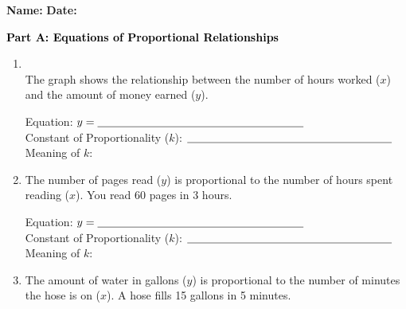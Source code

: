 \documentclass[12pt, letterpaper, fleqn]{article}
\newcommand{\blanklong}{\underline{\hspace{6.5cm}}}
\begin{document}
\textbf{Name:} \underline{\hspace{5cm}}
\hfill
\textbf{Date:} \underline{\hspace{3cm}}\\

\begin{tcolorbox}[colback=customteal!20]
\large\textcolor{black}{\textbf{Part A: Equations of Proportional Relationships}}
\end{tcolorbox}

\vspace{3mm}

\begin{enumerate}[itemsep=2.5cm, leftmargin=0.6cm]
\item {} \\
The graph shows the relationship between the number of hours worked ($x$) and the amount of money earned ($y$).

\vspace{1.5cm} %

\begin{tcolorbox}[colback=customteal!10, sharp corners]
Equation: $y = \blanklong$ \\
Constant of Proportionality ($k$): $\blanklong$ \\
Meaning of $k$: \blanklong
\end{tcolorbox}

\vspace{1.5cm}
\item The number of pages read ($y$) is proportional to the number of hours spent reading ($x$). You read 60 pages in 3 hours.

\vspace{1.5cm}

\begin{tcolorbox}[colback=customteal!10, sharp corners]
Equation: $y = \blanklong$ \\
Constant of Proportionality ($k$): $\blanklong$ \\
Meaning of $k$: \blanklong
\end{tcolorbox}

\vspace{1.5cm}
\item The amount of water in gallons ($y$) is proportional to the number of minutes the hose is on ($x$). A hose fills 15 gallons in 5 minutes.


\end{enumerate}
\end{document}
